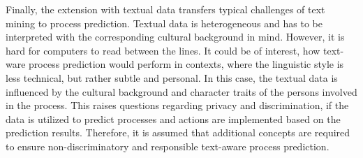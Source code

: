 Finally, the extension with textual data transfers typical challenges of text mining to process prediction.
Textual data is heterogeneous and has to be interpreted with the corresponding cultural background in mind.
However, it is hard for computers to read between the lines.
It could be of interest, how text-ware process prediction would perform in contexts, where the linguistic style is less technical, but rather subtle and personal.
In this case, the textual data is influenced by the cultural background and character traits of the persons involved in the process.
This raises questions regarding privacy and discrimination, if the data is utilized to predict processes and actions are implemented based on the prediction results.
Therefore, it is assumed that additional concepts are required to ensure non-discriminatory and responsible text-aware process prediction.